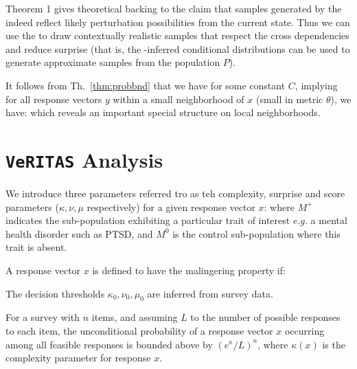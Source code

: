 \documentclass[onecolumn,10pt]{IEEEtran}
\def\vrts{\texttt{VeRITAS}\xspace}
\def\x{x}
\begin{document}
Theorem 1 gives theoretical backing to the claim that samples generated by the \qnet indeed reflect likely perturbation possibilities from the current state.  Thus we can use the \qnet to draw contextually realistic samples that respect the  cross dependencies and reduce surprise  (that is, the \qnet-inferred conditional distributions can be used to  generate approximate samples from the population $P$). 

\begin{rem}\label{rem:neighborhood}
  It follows from Th.~\ref{thm:probbnd} that we have for some constant $C$,
  implying for all response vectors $y$ within a small neighborhood of $x$ (small in metric $\theta$), we
  have:
  which reveals an important special structure on local neighborhoods.
\end{rem}

\section{\vrts Analysis}

\begin{defn}[Algorithm \vrts Parameters]\label{defvrts}
  We introduce three parameters referred tro as teh complexity, surprise and score parameters ($\kappa,\nu,\mu$ respectively) for a given response vector $x$:
  where $M^+$ indicates the sub-population exhibiting  a particular trait of interest $e.g.$ a mental health disorder such as PTSD, and $M^0$ is the control sub-population where this trait is absent.
\end{defn}

\begin{defn}
  A response vector $x$  is defined to  have the malingering property if:
\end{defn}
The decision thresholds $\kappa_0,\nu_0,\mu_0$ are  inferred  from  survey data.
\begin{lem}[Complexity]\label{thm-complexity}
  For a survey with $n$ items, and assuming $L$ to the  number of possible responses to each item, the unconditional probability of a response vector $x$ occurring among all feasible responses is bounded above by
  $(e^\kappa / L)^n$, where $\kappa(x) $ is the complexity parameter for response $\x$.
\end{lem}
\end{document}
